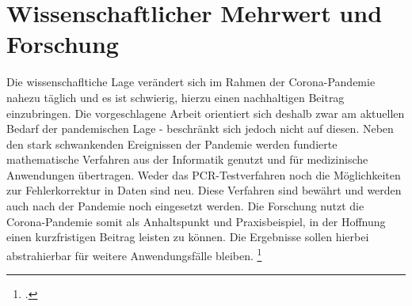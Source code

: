 

\chapter{Wissenschaftlicher Mehrwert und Forschung}
Die wissenschafltiche Lage verändert sich im Rahmen der Corona-Pandemie nahezu täglich und es ist schwierig, hierzu einen nachhaltigen Beitrag einzubringen.
Die vorgeschlagene Arbeit orientiert sich deshalb zwar am aktuellen Bedarf der pandemischen Lage - beschränkt sich jedoch nicht auf diesen.
Neben den stark schwankenden Ereignissen der Pandemie werden fundierte mathematische Verfahren aus der Informatik genutzt und für medizinische Anwendungen übertragen.
Weder das PCR-Testverfahren noch die Möglichkeiten zur Fehlerkorrektur in Daten sind neu.
Diese Verfahren sind bewährt und werden auch nach der Pandemie noch eingesetzt werden.
Die Forschung nutzt die Corona-Pandemie somit als Anhaltspunkt und Praxisbeispiel, in der Hoffnung einen kurzfristigen Beitrag leisten zu können.
Die Ergebnisse sollen hierbei abstrahierbar für weitere Anwendungsfälle bleiben. \footcite{Testbuch}